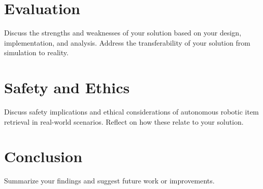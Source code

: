 \documentclass[conference]{IEEEtran}
\begin{document}
\section{Evaluation}
Discuss the strengths and weaknesses of your solution based on your design, implementation, and analysis. Address the transferability of your solution from simulation to reality.

\section{Safety and Ethics}
Discuss safety implications and ethical considerations of autonomous robotic item retrieval in real-world scenarios. Reflect on how these relate to your solution.

\section{Conclusion}
Summarize your findings and suggest future work or improvements.



\end{document}
